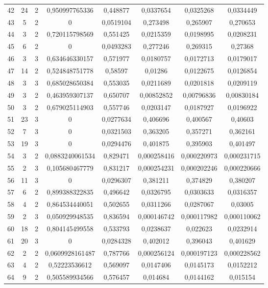 \begin{longtable}{|c|c|c|c|c|c|c|c|}
42 & 24 & 2 & 0,950997765336 & 0,448877 & 0,0337654 & 0,0325268 & 0,0334449  \\
43 & 5 & 2 & 0 & 0,0519104 & 0,273498 & 0,265907 & 0,270653  \\
44 & 3 & 2 & 0,720115798569 & 0,551425 & 0,0215359 & 0,0198995 & 0,0208231  \\
45 & 6 & 2 & 0 & 0,0493283 & 0,277246 & 0,269315 & 0,27368  \\
46 & 3 & 3 & 0,634646330157 & 0,571977 & 0,0180757 & 0,0172713 & 0,0179017  \\
47 & 14 & 2 & 0,524848751778 & 0,58597 & 0,01286 & 0,0122675 & 0,0126854  \\
48 & 3 & 3 & 0,685028650384 & 0,553035 & 0,0211689 & 0,0201818 & 0,0209119  \\
49 & 3 & 2 & 0,463959307137 & 0,650707 & 0,00852852 & 0,00796836 & 0,00830184  \\
50 & 3 & 2 & 0,679025114903 & 0,557746 & 0,0203147 & 0,0187927 & 0,0196922  \\
51 & 23 & 3 & 0 & 0,0277634 & 0,406696 & 0,400567 & 0,40603  \\
52 & 7 & 3 & 0 & 0,0321503 & 0,363205 & 0,357271 & 0,362161  \\
53 & 19 & 3 & 0 & 0,0294476 & 0,401875 & 0,395903 & 0,401497  \\
54 & 3 & 2 & 0,0883240061534 & 0,829471 & 0,000258416 & 0,000220973 & 0,000231715  \\
55 & 2 & 3 & 0,105680467779 & 0,831217 & 0,000254231 & 0,000202246 & 0,000220666  \\
56 & 11 & 3 & 0 & 0,0296307 & 0,381211 & 0,374829 & 0,380207  \\
57 & 6 & 2 & 0,899388322835 & 0,496642 & 0,0326795 & 0,0303633 & 0,0316357  \\
58 & 4 & 2 & 0,864534440051 & 0,502655 & 0,0311266 & 0,0287067 & 0,03005  \\
59 & 2 & 3 & 0,050929948535 & 0,836594 & 0,000146742 & 0,000117982 & 0,000110062  \\
60 & 18 & 2 & 0,804145499558 & 0,533793 & 0,0238637 & 0,022623 & 0,0232914  \\
61 & 20 & 3 & 0 & 0,0284328 & 0,402012 & 0,396043 & 0,401629  \\
62 & 2 & 2 & 0,0609928161487 & 0,787766 & 0,000256124 & 0,000197123 & 0,000228562  \\
63 & 4 & 2 & 0,52223536612 & 0,569097 & 0,0147406 & 0,0145173 & 0,0152212  \\
64 & 9 & 2 & 0,505589934566 & 0,576457 & 0,014684 & 0,0144162 & 0,015154  \\

\end{longtable}
